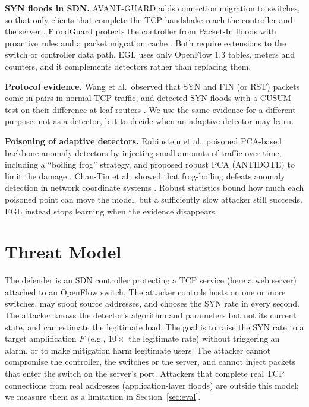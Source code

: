 \documentclass[conference]{IEEEtran}
\begin{document}
\textbf{SYN floods in SDN.} AVANT-GUARD adds connection migration to switches, so that only clients that complete the TCP handshake reach the controller and the server \cite{shin2013avantguard}. FloodGuard protects the controller from Packet-In floods with proactive rules and a packet migration cache \cite{wang2015floodguard}. Both require extensions to the switch or controller data path. EGL uses only OpenFlow 1.3 tables, meters and counters, and it complements detectors rather than replacing them.

\textbf{Protocol evidence.} Wang et al.\ observed that SYN and FIN (or RST) packets come in pairs in normal TCP traffic, and detected SYN floods with a CUSUM test on their difference at leaf routers \cite{wang2002syn}. We use the same evidence for a different purpose: not as a detector, but to decide when an adaptive detector may learn.

\textbf{Poisoning of adaptive detectors.} Rubinstein et al.\ poisoned PCA-based backbone anomaly detectors by injecting small amounts of traffic over time, including a ``boiling frog'' strategy, and proposed robust PCA (ANTIDOTE) to limit the damage \cite{rubinstein2009antidote}. Chan-Tin et al.\ showed that frog-boiling defeats anomaly detection in network coordinate systems \cite{chantin2009frog}. Robust statistics bound how much each poisoned point can move the model, but a sufficiently slow attacker still succeeds. EGL instead stops learning when the evidence disappears.

\section{Threat Model}\label{sec:threat}
The defender is an SDN controller protecting a TCP service (here a web server) attached to an OpenFlow switch. The attacker controls hosts on one or more switches, may spoof source addresses, and chooses the SYN rate in every second. The attacker knows the detector's algorithm and parameters but not its current state, and can estimate the legitimate load. The goal is to raise the SYN rate to a target amplification $F$ (e.g., $10\times$ the legitimate rate) without triggering an alarm, or to make mitigation harm legitimate users. The attacker cannot compromise the controller, the switches or the server, and cannot inject packets that enter the switch on the server's port. Attackers that complete real TCP connections from real addresses (application-layer floods) are outside this model; we measure them as a limitation in Section~\ref{sec:eval}.
\end{document}
